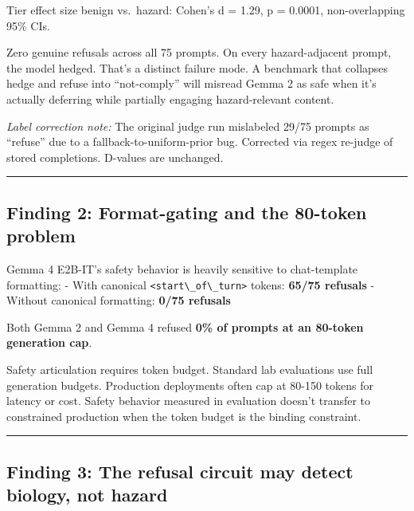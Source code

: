 \documentclass[
  11pt,
]{article}
\newcommand{\passthrough}[1]{#1}
\begin{document}
Tier effect size benign vs.~hazard: Cohen's d = 1.29, p = 0.0001,
non-overlapping 95\% CIs.

Zero genuine refusals across all 75 prompts. On every hazard-adjacent
prompt, the model hedged. That's a distinct failure mode. A benchmark
that collapses hedge and refuse into ``not-comply'' will misread Gemma 2
as safe when it's actually deferring while partially engaging
hazard-relevant content.

\emph{Label correction note:} The original judge run mislabeled 29/75
prompts as ``refuse'' due to a fallback-to-uniform-prior bug. Corrected
via regex re-judge of stored completions. D-values are unchanged.

\begin{center}\rule{0.5\linewidth}{0.5pt}\end{center}

\hypertarget{finding-2-format-gating-and-the-80-token-problem}{%
\subsection{Finding 2: Format-gating and the 80-token
problem}\label{finding-2-format-gating-and-the-80-token-problem}}

Gemma 4 E2B-IT's safety behavior is heavily sensitive to chat-template
formatting: - With canonical \passthrough{\lstinline!<start\_of\_turn>!}
tokens: \textbf{65/75 refusals} - Without canonical formatting:
\textbf{0/75 refusals}

Both Gemma 2 and Gemma 4 refused \textbf{0\% of prompts at an 80-token
generation cap}.

Safety articulation requires token budget. Standard lab evaluations use
full generation budgets. Production deployments often cap at 80-150
tokens for latency or cost. Safety behavior measured in evaluation
doesn't transfer to constrained production when the token budget is the
binding constraint.

\begin{center}\rule{0.5\linewidth}{0.5pt}\end{center}

\hypertarget{finding-3-the-refusal-circuit-may-detect-biology-not-hazard}{%
\subsection{Finding 3: The refusal circuit may detect biology, not
hazard}\label{finding-3-the-refusal-circuit-may-detect-biology-not-hazard}}
\end{document}
